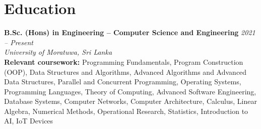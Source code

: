 
\section*{Education}
\BigDivider
\noindent
\textbf{B.Sc. (Hons) in Engineering – Computer Science and Engineering}
\hfill \textit{2021 -- Present}\\
\textit{University of Moratuwa, Sri Lanka}\\[0.25em]
\small
\textbf{Relevant coursework:}
Programming Fundamentals, Program Construction (OOP), Data Structures and Algorithms,
Advanced Algorithms and Advanced Data Structures, Parallel and Concurrent Programming,
Operating Systems, Programming Languages, Theory of Computing, Advanced Software
Engineering, Database Systems, Computer Networks, Computer Architecture, Calculus,
Linear Algebra, Numerical Methods, Operational Research, Statistics, Introduction to AI,
IoT Devices
\normalsize

